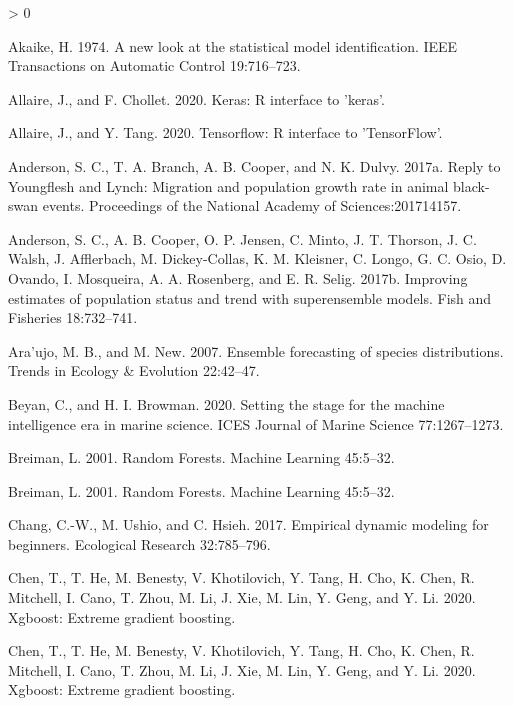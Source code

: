 \documentclass[
]{article}
\newlength{\cslhangindent}
\newenvironment{CSLReferences}[2] %
 {%
  \setlength{\parindent}{0pt}
  \ifodd #1 \everypar{\setlength{\hangindent}{\cslhangindent}}\ignorespaces\fi
  \ifnum #2 > 0
  \setlength{\parskip}{#2\baselineskip}
  \fi
 }%
 {}
\begin{document}
\hypertarget{refs}{}
\begin{CSLReferences}{1}{0}
\leavevmode\hypertarget{ref-akaike1974}{}%
Akaike, H. 1974. A new look at the statistical model identification. IEEE Transactions on Automatic Control 19:716--723.

\leavevmode\hypertarget{ref-allaire2020a}{}%
Allaire, J., and F. Chollet. 2020. Keras: R interface to 'keras'.

\leavevmode\hypertarget{ref-allaire2020}{}%
Allaire, J., and Y. Tang. 2020. Tensorflow: R interface to 'TensorFlow'.

\leavevmode\hypertarget{ref-anderson2017b}{}%
Anderson, S. C., T. A. Branch, A. B. Cooper, and N. K. Dulvy. 2017a. Reply to {Youngflesh} and {Lynch}: {Migration} and population growth rate in animal black-swan events. Proceedings of the National Academy of Sciences:201714157.

\leavevmode\hypertarget{ref-anderson2017a}{}%
Anderson, S. C., A. B. Cooper, O. P. Jensen, C. Minto, J. T. Thorson, J. C. Walsh, J. Afflerbach, M. Dickey-Collas, K. M. Kleisner, C. Longo, G. C. Osio, D. Ovando, I. Mosqueira, A. A. Rosenberg, and E. R. Selig. 2017b. Improving estimates of population status and trend with superensemble models. Fish and Fisheries 18:732--741.

\leavevmode\hypertarget{ref-araujo2007}{}%
Ara'ujo, M. B., and M. New. 2007. Ensemble forecasting of species distributions. Trends in Ecology \& Evolution 22:42--47.

\leavevmode\hypertarget{ref-beyan2020}{}%
Beyan, C., and H. I. Browman. 2020. Setting the stage for the machine intelligence era in marine science. ICES Journal of Marine Science 77:1267--1273.

\leavevmode\hypertarget{ref-breiman2001}{}%
Breiman, L. 2001. Random {Forests}. Machine Learning 45:5--32.

\leavevmode\hypertarget{ref-breiman2001}{}%
Breiman, L. 2001. Random {Forests}. Machine Learning 45:5--32.

\leavevmode\hypertarget{ref-chang2017}{}%
Chang, C.-W., M. Ushio, and C. Hsieh. 2017. Empirical dynamic modeling for beginners. Ecological Research 32:785--796.

\leavevmode\hypertarget{ref-chen2020}{}%
Chen, T., T. He, M. Benesty, V. Khotilovich, Y. Tang, H. Cho, K. Chen, R. Mitchell, I. Cano, T. Zhou, M. Li, J. Xie, M. Lin, Y. Geng, and Y. Li. 2020. Xgboost: Extreme gradient boosting.

\leavevmode\hypertarget{ref-chen2020}{}%
Chen, T., T. He, M. Benesty, V. Khotilovich, Y. Tang, H. Cho, K. Chen, R. Mitchell, I. Cano, T. Zhou, M. Li, J. Xie, M. Lin, Y. Geng, and Y. Li. 2020. Xgboost: Extreme gradient boosting.


\end{CSLReferences}
\end{document}
